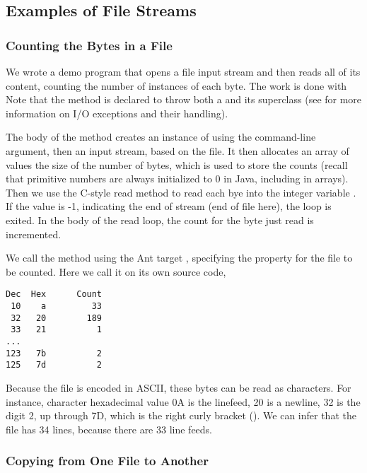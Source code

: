 \subsection{Examples of File Streams}


\subsubsection{Counting the Bytes in a File}\label{section:io-file-byte-count}

We wrote a demo program  that opens a file input
stream and then reads all of its content, counting the number of
instances of each byte.  The work is done with
%
%
Note that the  method is declared to throw both
a  and its superclass
 (see  for more information
on I/O exceptions and their handling).  

The body of the method creates an instance of  using the
command-line argument, then an input stream, based on the file.  It
then allocates an array of  values the size of the number
of bytes, which is used to store the counts (recall that primitive
numbers are always initialized to 0 in Java, including in arrays).
Then we use the C-style read method to read each bye into the integer
variable .  If the value is -1, indicating the end of stream
(end of file here), the loop is exited.  In the body of the read loop,
the count for the byte just read is incremented.

We call the method using the Ant target , 
specifying the  property for the file to be counted. 
Here we call it on its own source code,
%
\begin{verbatim}
Dec  Hex      Count
 10    a         33
 32   20        189
 33   21          1
...
123   7b          2
125   7d          2
\end{verbatim}
%
Because the file is encoded in ASCII, these bytes can be read as
characters.  For instance, character hexadecimal value 0A is the
linefeed, 20 is a newline, 32 is the digit 2, up through 7D, which is
the right curly bracket (\code{\}}).  We can infer that the file has
34 lines, because there are 33 line feeds.  

\subsubsection{Copying from One File to Another}\label{section:io-copy-file}

